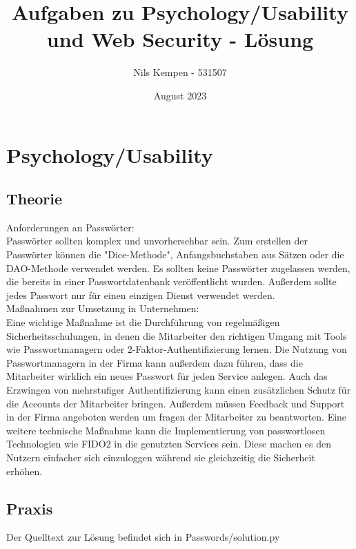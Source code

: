\documentclass[ngerman]{article}
\title{Aufgaben zu Psychology/Usability und Web Security - Lösung}
\author{Nils Kempen - 531507}
\date{August 2023}
\begin{document}
\maketitle


\section{Psychology/Usability}

\subsection{Theorie}
Anforderungen an Passwörter:\\ 
Passwörter sollten komplex und unvorhersehbar sein. Zum erstellen der Passwörter können die "Dice-Methode", Anfangsbuchstaben aus Sätzen oder die DAO-Methode verwendet werden.
Es sollten keine Passwörter zugelassen werden, die bereits in einer Passwortdatenbank veröffentlicht wurden.
Außerdem sollte jedes Passwort nur für einen einzigen Dienst verwendet werden.\\

\noindent Maßnahmen zur Umsetzung in Unternehmen:\\
Eine wichtige Maßnahme ist die Durchführung von regelmäßigen Sicherheitsschulungen, in denen die Mitarbeiter den richtigen Umgang mit Tools wie Passwortmanagern oder 2-Faktor-Authentifizierung lernen.
Die Nutzung von Passwortmanagern in der Firma kann außerdem dazu führen, dass die Mitarbeiter wirklich ein neues Passwort für jeden Service anlegen. Auch das Erzwingen von mehrstufiger Authentifizierung kann einen zusätzlichen Schutz für die Accounts der Mitarbeiter bringen.
Außerdem müssen Feedback und Support in der Firma angeboten werden um fragen der Mitarbeiter zu beantworten.
Eine weitere technische Maßnahme kann die Implementierung von passwortlosen Technologien wie FIDO2 in die genutzten Services sein. Diese machen es den Nutzern einfacher sich einzuloggen während sie gleichzeitig die Sicherheit erhöhen. 


\subsection{Praxis}
Der Quelltext zur Lösung befindet sich in Passwords/solution.py
\end{document}

